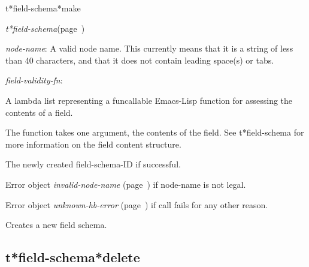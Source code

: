 \begin{description}

\item [Name:]  t*field-schema*make


\item [Class:]
{\sl t*field-schema}\hfill(page~\pageref{t*field-schema})


\item [Parameters:]
\item {\sl node-name}:  
A valid node name. This currently means that it is a
string of less than 40 characters, and that it does
not contain leading space(s) or tabs.

\item {\sl field-validity-fn}:  

A lambda list representing a funcallable Emacs-Lisp function for
assessing the contents of a field.

The function takes one argument, the contents of the field.
See t*field-schema for more information on the field content
structure.



\item [Return-value:]
The newly created field-schema-ID if successful. 

Error object {\sl invalid-node-name} (page~\pageref{invalid-node-name}) if node-name is not
legal.

Error object {\sl unknown-hb-error} (page~\pageref{unknown-hb-error}) if call fails for 
any other reason.

\item [Description:]

Creates a new field schema.  

\item [Public:]



\end{description}
\horizontalline

\subsection{t*field-schema*delete}
\label{t*field-schema*delete}

